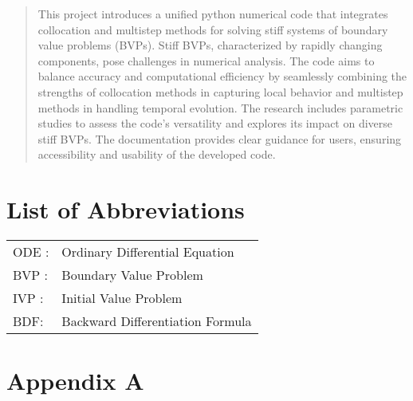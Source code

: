\documentclass{report}
\begin{document}
\begin{abstract}
    This project introduces a unified python numerical code that integrates collocation and multistep methods for solving stiff systems of boundary value problems (BVPs). Stiff BVPs, characterized by rapidly changing components, pose challenges in numerical analysis. The code aims to balance accuracy and computational efficiency by seamlessly combining the strengths of collocation methods in capturing local behavior and multistep methods in handling temporal evolution. The research includes parametric studies to assess the code's versatility and explores its impact on diverse stiff BVPs. The documentation provides clear guidance for users, ensuring accessibility and usability of the developed code.
    \end{abstract}


\tableofcontents

\listoffigures

\listoftables

\chapter*{List of Abbreviations}
\begin{tabular}{ll}
    ODE : & Ordinary Differential Equation \\
    BVP : & Boundary Value Problem \\
    IVP : & Initial Value Problem \\
    BDF: &Backward Differentiation Formula
\end{tabular}



 







\begin{thebibliography}{9}
  
\end{thebibliography}
                                                                                                                                                                                                                 
\appendix
\chapter{Appendix A}
\end{document}
